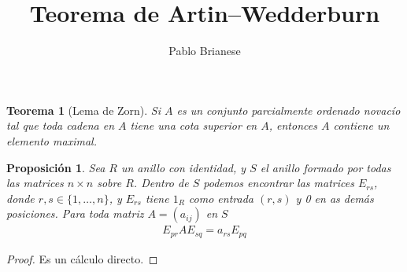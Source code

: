 \documentclass{report}
\title{Teorema de Artin--Wedderburn}
\author{Pablo Brianese}
\newtheorem{theorem}{Teorema}
\newtheorem{proposition}{Proposición}
\begin{document}
  \maketitle

  \begin{theorem}[Lema de Zorn]
    Si \(A\) es un conjunto parcialmente ordenado novacío tal que toda cadena en \(A\) tiene una cota superior en \(A\), entonces \(A\) contiene un elemento maximal.
  \end{theorem}

  \begin{proposition}
    Sea \(R\) un anillo con identidad, y \(S\) el anillo formado por todas las matrices \(n \times n\) sobre \(R\).
    Dentro de \(S\) podemos encontrar las matrices \(E_{r s}\), donde \(r, s \in \{1, \dots, n\}\), y \(E_{r s}\) tiene \(1_R\) como entrada \((r, s)\) y 0 en as demás posiciones.
    Para toda matriz \(A = (a_{i j})\) en \(S\)
    \begin{align}
      E_{p r} A E_{s q}
      =
      a_{r s} E_{p q}
    \end{align}
  \end{proposition}
  \begin{proof}
    Es un cálculo directo.
  \end{proof}
\end{document}
